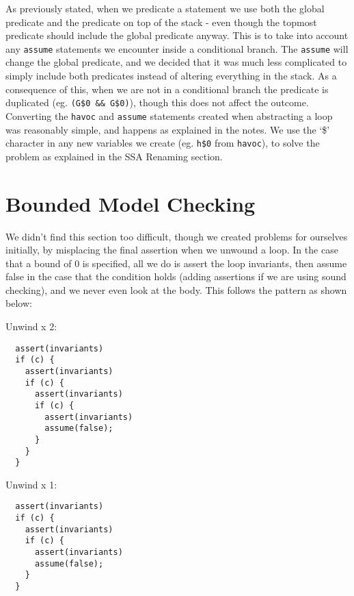 \documentclass[11pt]{article}
\begin{document}
As previously stated, when we predicate a statement we use both the global predicate and the predicate on top of the stack - even though the topmost predicate should include the global predicate anyway. This is to take into account any \verb|assume| statements we encounter inside a conditional branch. The \verb|assume| will change the global predicate, and we decided that it was much less complicated to simply include both predicates instead of altering everything in the stack. As a consequence of this, when we are not in a conditional branch the predicate is duplicated (eg. \verb|(G$0 && G$0)|), though this does not affect the outcome. \\

Converting the \verb|havoc| and \verb|assume| statements created when abstracting a loop was reasonably simple, and happens as explained in the notes. We use the `\$' character in any new variables we create (eg. \verb|h$0| from \verb|havoc|), to solve the problem as explained in the SSA Renaming section. \\

\section{Bounded Model Checking}

We didn't find this section too difficult, though we created problems for ourselves initially, by misplacing the final assertion when we unwound a loop. In the case that a bound of 0 is specified, all we do is assert the loop invariants, then assume false in the case that the condition holds (adding assertions if we are using sound checking), and we never even look at the body. This follows the pattern as shown below: \\

\clearpage

Unwind x 2:
\begin{verbatim}
  assert(invariants)
  if (c) {
    assert(invariants)
    if (c) {
      assert(invariants)
      if (c) {
        assert(invariants)
        assume(false);
      }
    }
  }
\end{verbatim}

\vspace{\baselineskip}

Unwind x 1:
\begin{verbatim}
  assert(invariants)
  if (c) {
    assert(invariants)
    if (c) {
      assert(invariants)
      assume(false);
    }
  }
\end{verbatim}
\end{document}
